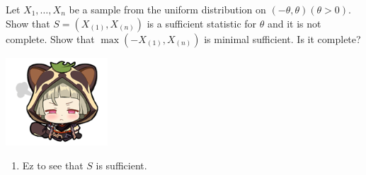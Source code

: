\documentclass[oneside]{book}
\begin{document}
\setmainfont{CMU Serif}
\begin{tcolorbox}[colback=bgcol,colframe=bodercol,title=Problem 2]
    Let $X_{1}, \ldots, X_{n}$ be a sample from the uniform distribution on $(-\theta, \theta)(\theta>0)$. Show that $S=\left(X_{(1)}, X_{(n)}\right)$ is a sufficient statistic for $\theta$ and it is not complete. Show that $\max \left(-X_{(1)}, X_{(n)}\right)$ is minimal sufficient. Is it complete?
\end{tcolorbox}
\begin{marginfigure}%
    \includegraphics[width=1.5in]{chibis/file_026.png}
\end{marginfigure}%
\setmainfont{Indie Flower}
\begin{enumerate}
    \item  Ez to see that $S$ is sufficient. 
\end{enumerate}
\end{document}
